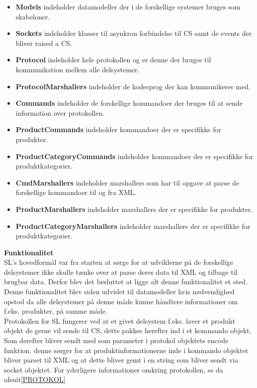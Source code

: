\begin{itemize}
\item \textbf{Models} indeholder datamodeller der i de forskellige systemer bruges som skabeloner. 
\item \textbf{Sockets} indeholder klasser til asynkron forbindelse til \gls{CS} samt de events der bliver raised a \gls{CS}.
\item \textbf{Protocol} indeholder hele protokollen og er denne der bruges til kommunikation mellem alle delsystemer.
\item \textbf{ProtocolMarshallers} indeholder de kodesprog der kan kommunikeres med.
\item \textbf{Commands} indeholder de forskellige kommandoer der bruges til at sende information over protokollen.
\item \textbf{ProductCommands} indeholder kommandoer der er specifikke for produkter.
\item \textbf{ProductCategoryCommands} indeholder kommandoer der er specifikke for produktkategorier.
\item \textbf{CmdMarshallers} indeholder marshallers som har til opgave at parse de forskellige kommandoer til og fra XML.
\item \textbf{ProductMarshallers} indeholder marshallers der er specifikke for produkter.
\item \textbf{ProductCategoryMarshallers} indeholder marshallers der er specifikke for produktkategorier.
\end{itemize}

\textbf{Funktionalitet}\\

\gls{SL}'s hovedformål var fra starten at sørge for at udviklerne på de forskellige delsystemer ikke skulle tænke over at parse deres data til XML og tilbage til brugbar data. Derfor blev det besluttet at ligge alt denne funktionalitet et sted. Denne funktionalitet blev siden udvidet til datamodeller hvis nødvendighed opstod da alle delsystemer på denne måde kunne håndtere informationer om f.eks. produkter, på samme måde.\\

Protokollen for \gls{SL} fungerer ved at et givet delsystem f.eks. laver et produkt objekt de gerne vil sende til \gls{CS}, dette pakkes herefter ind i et kommando objekt, Som derefter bliver sendt med som parameter i protokol objektets encode funktion. denne sørger for at produktinformationerne inde i kommando objektet bliver parset til XML og at dette bliver gemt i en string som bliver sendt via socket objektet. For yderligere informationer omkring protokollen, se da afsnit\ref{PROTOKOL}\\


